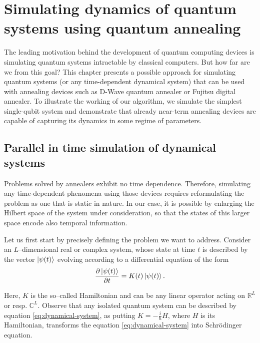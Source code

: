 \chapter{Simulating dynamics of quantum systems using quantum annealing}
\label{chapter:simulating}

The leading motivation behind the development of quantum computing devices is simulating quantum systems intractable by classical computers. But how far are we from this goal? This chapter presents a possible approach for simulating quantum systems (or any time-dependent dynamical system) that can be used with annealing devices such as D-Wave quantum annealer or Fujitsu digital annealer. To illustrate the working of our algorithm, we simulate the simplest single-qubit system and demonstrate that already near-term annealing devices are capable of capturing its dynamics in some regime of parameters.

\section{Parallel in time simulation of dynamical systems}
Problems solved by annealers exhibit no time dependence. Therefore, simulating any time-dependent phenomena using those devices requires reformulating the problem as one that is static in nature. In our case, it is possible by enlarging the Hilbert space of the system under consideration, so that the states of this larger space encode also temporal information.

Let us first start by precisely defining the problem we want to address.
Consider an $L$--dimensional real or complex system, whose state at time $t$
is described by the vector $\ket{\psi(t)}$  evolving according to a differential equation of
the form
\begin{equation}
\label{eq:dynamical-system}
    \frac{\partial \ket{\psi(t)}}{\partial t} = K(t) \ket{\psi(t)}.
\end{equation}

Here, $K$ is the so--called Hamiltonian and can be any linear operator acting on $\mathbb{R}^L$ or
resp. $\mathbb{C}^L$. Observe that any isolated quantum system can be described by equation
\eqref{eq:dynamical-system}, as putting $K=-\frac{i}{\hbar}H$, where $H$ is its Hamiltonian,
transforms the equation \eqref{eq:dynamical-system} into Schr\"{o}dinger equation.

